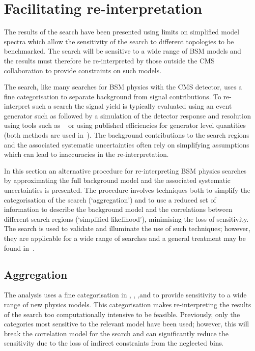 \chapter{Facilitating re-interpretation} %
\label{cha:simplifiedLikelihood}
The results of the \alphat search have been presented using limits on simplified model
spectra which allow the sensitivity of the search to different topologies 
to be benchmarked. The search will be sensitive to a wide range of BSM models
and the results must therefore be re-interpreted by those outside the 
CMS collaboration to provide constraints on such models.

The \alphat search, like many searches for BSM physics with the CMS detector, uses a 
fine categorisation to separate background from signal contributions. To re-interpret
such a search the signal yield is typically evaluated using an event generator such as \PYTHIA 
followed by a simulation of the detector response and resolution using tools 
such as \DELPHES~\cite{delphes} or using published efficiencies for generator
level quantities (both methods are used in~\cite{Drees:2013wra,Fastlim,mastercode}).
The background contributions to the search regions and the associated systematic uncertainties often rely
on simplifying assumptions which can lead to inaccuracies in the re-interpretation. 

In this section an alternative procedure for re-interpreting BSM physics searches by approximating
the full background model and the associated systematic uncertainties is presented. 
The procedure involves techniques both to simplify the categorisation of the search (`aggregation')
and to use a reduced set of information to describe the background model 
and the correlations between different search regions (`simplified likelihood'),
minimising the loss of sensitivity. The \alphat search is used to validate and illuminate
the use of such techniques; however, they are applicable for a wide range of 
searches and a general treatment may be found in~\cite{simp-lik}.

\section{Aggregation}%
\label{sec:agg-reg}
The \alphat analysis uses a fine categorisation in \njet, \nb, \scalht,and \mht to provide
sensitivity to a wide range of new physics models. This categorisation makes re-interpreting
the results of the search too computationally intensive to be feasible. Previously, 
only the categories most sensitive to the relevant model have been used; however,
this will break the correlation model for the search and can significantly reduce
the sensitivity due to the loss of indirect constraints from
the neglected bins. 

